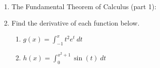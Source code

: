 \documentclass[11pt,fleqn]{article}
\renewcommand{\d}{\displaystyle}
\begin{document}
\vspace*{-0.7in}

\begin{center}
  \Large{}
  \end{center}
\begin{enumerate}
\item The Fundamental Theorem of Calculus (part 1):
\vfill
\item Find the derivative of each function below.
	\begin{multicols}{2}
	\begin{enumerate}
	\item $\d g(x)=\int_{-1}^x t^2e^t\: dt$
	\item $\d h(x)=\int_0^{x^2+1} \sin(t) \: dt$
	\end{enumerate}
	\end{multicols}
\vfill


\end{enumerate}
\end{document}
